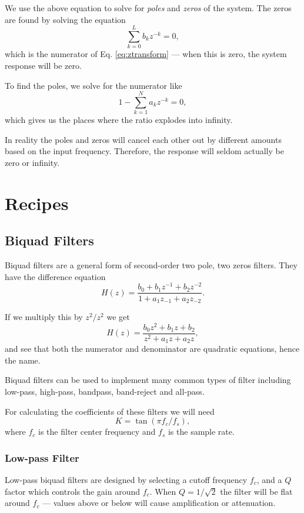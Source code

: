 \documentclass{article}
\begin{document}
We use the above equation to solve for \textit{poles} and \textit{zeros} of the system. The zeros are found by solving the equation
\begin{equation}
    \sum_{k=0}^L b_k z^{-k} = 0,
\end{equation}
which is the numerator of Eq. \ref{eq:ztransform} --- when this is zero, the system response will be zero.

To find the poles, we solve for the numerator like
\begin{equation}
    1 - \sum_{k=1}^N a_k z^{-k} = 0,
\end{equation}
which gives us the places where the ratio explodes into infinity.

In reality the poles and zeros will cancel each other out by different amounts based on the input frequency. Therefore, the response will seldom actually be zero or infinity.

\section{Recipes}
\subsection{Biquad Filters}
Biquad filters are a general form of second-order two pole, two zeros filters. They have the difference equation
\begin{equation}
    H(z) = \frac{b_0 + b_1 z^{-1} + b_2 z ^{-2}}{1 + a_1 z_{-1} + a_2 z_{-2}}.
\end{equation}

If we multiply this by $z^2 / z^2$ we get 
\begin{equation}
    H(z) = \frac{b_0 z^2 + b_1 z + b_2}{z^2 + a_1 z + a_2 z},
\end{equation}
and see that both the numerator and denominator are quadratic equations, hence the name.

Biquad filters can be used to implement many common types of filter including low-pass, high-pass, bandpass, band-reject and all-pass.

For calculating the coefficients of these filters we will need
\begin{equation}
    K = \tan (\pi f_c / f_s),
\end{equation}
where $f_c$ is the filter center frequency and $f_s$ is the sample rate.

\subsubsection{Low-pass Filter}
Low-pass biquad filters are designed by selecting a cutoff frequency $f_c$, and a $Q$ factor which controls the gain around $f_c$.
When $Q = 1/\sqrt 2$ the filter will be flat around $f_c$ --- values above or below will cause amplification or attenuation.
\end{document}
